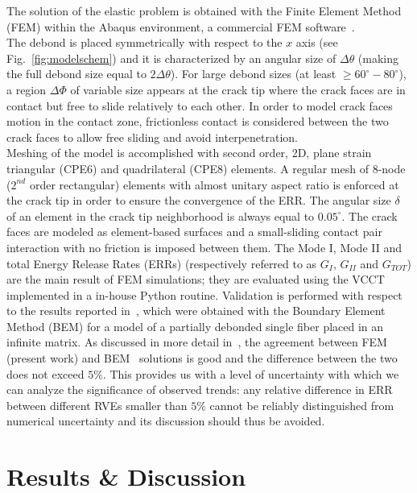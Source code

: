 \documentclass[smallextended]{svjour3}       %
\begin{document}
The solution of the elastic problem is obtained with the Finite Element Method (FEM) within the Abaqus environment, a commercial FEM software~\cite{abq12}.\\
The debond is placed symmetrically with respect to the $x$ axis (see Fig.~\ref{fig:modelschem}) and it is characterized by an angular size of $\Delta\theta$ (making the full debond size equal to $2\Delta\theta$). For large debond sizes (at least $\geq 60^{\circ}-80^{\circ}$), a region $\Delta\Phi$ of variable size appears at the crack tip where the crack faces are in contact but free to slide relatively to each other. In order to model crack faces motion in the contact zone, frictionless contact is considered between the two crack faces to allow free sliding and avoid interpenetration.\\
Meshing of the model is accomplished with second order, 2D, plane strain triangular (CPE6) and quadrilateral (CPE8) elements. A regular mesh of 8-node ($2^{nd}$ order rectangular) elements with almost unitary aspect ratio is enforced at the crack tip in order to ensure the convergence of the ERR. The angular size $\delta$ of an element in the crack tip neighborhood is always equal to $0.05^{\circ}$. The crack faces are modeled as element-based surfaces and a small-sliding contact pair interaction with no friction is imposed between them. The Mode I, Mode II and total Energy Release Rates (ERRs) (respectively referred to as $G_{I}$, $G_{II}$ and $G_{TOT}$) are the main result of FEM simulations; they are evaluated using the VCCT~\cite{Krueger2004} implemented in a in-house Python routine. Validation is performed with respect to the results reported in~\cite{Paris2007,Sandino2016}, which were obtained with the Boundary Element Method (BEM) for a model of a partially debonded single fiber placed in an infinite matrix. As discussed in more detail in~\cite{DiStasio2019}, the agreement between FEM (present work) and BEM~\cite{Paris2007,Sandino2016} solutions is good and the difference between the two does not exceed $5\%$. This provides us with a level of uncertainty with which we can analyze the significance of observed trends: any relative difference in ERR between different RVEs smaller than $5\%$ cannot be reliably distinguished from numerical uncertainty and its discussion should thus be avoided.

\section{Results \& Discussion}\label{sec:results}
\end{document}
